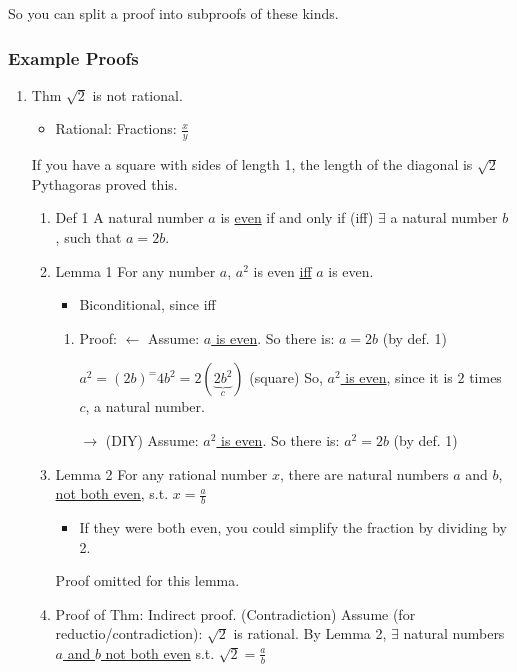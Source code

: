\documentclass[11pt]{article}
\begin{document}
So you can split a proof into subproofs of these kinds.

\subsubsection{Example Proofs}
\label{sec:org4e0ca31}
\begin{enumerate}
\item Thm
\label{sec:orgc9662ca}
\(\sqrt{2}\) is not rational.
\begin{itemize}
\item Rational: Fractions: \(\frac{x}{y}\)
\end{itemize}
If you have a square with sides of length 1, the length of the diagonal is \(\sqrt{2}\)
Pythagoras proved this.
\begin{enumerate}
\item Def 1
\label{sec:org682bd07}
A natural number \(a\) is \uline{even} if and only if (iff) \(\exists\) a natural number \(b\), such that \(a=2b\).
\item Lemma 1
\label{sec:org1eac678}
For any number \(a\), \(a^2\) is even \uline{iff} \(a\) is even.
\begin{itemize}
\item Biconditional, since iff
\end{itemize}
\begin{enumerate}
\item Proof:
\label{sec:org558a45c}
\(\leftarrow\) Assume: \uline{\(a\) is even}.
So there is: \(a=2b\) (by def. 1)

\(a^2=(2b)^=4b^2=2(\underbrace{2b^2}_c)\) (square)
So, \uline{\(a^2\) is even}, since it is \(2\) times \(c\), a natural number.

\(\rightarrow\) (DIY)
Assume: \uline{\(a^2\) is even}.
So there is: \(a^2=2b\) (by def. 1)
\end{enumerate}

\item Lemma 2
\label{sec:orgcaf6b4b}
For any rational number \(x\), there are natural numbers \(a\) and \(b\), \uline{not both even}, s.t. \(x=\frac{a}{b}\)
\begin{itemize}
\item If they were both even, you could simplify the fraction by dividing by 2.
\end{itemize}
Proof omitted for this lemma.
\item Proof of Thm:
\label{sec:orgd4f9075}
Indirect proof. (Contradiction)
Assume (for reductio/contradiction): \(\sqrt{2}\) is rational.
By Lemma 2, \(\exists\) natural numbers \uline{\(a\) and \(b\) not both even} s.t. \(\sqrt{2}=\frac{a}{b}\)


\end{enumerate}
\end{enumerate}
\end{document}
